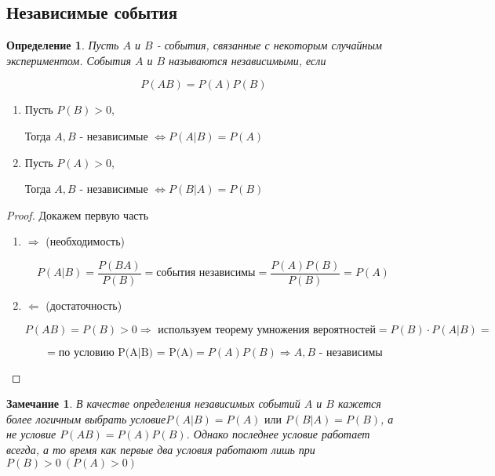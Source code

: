 \documentclass[a4paper, 14pt]{report}
\newtheorem{defenition}{Определение}[section]
\newtheorem{note}{Замечание}[section]
\begin{document}
\subsection{Независимые события}

\begin{defenition}
    Пусть $A$ и $B$ - события, связанные с некоторым случайным экспериментом. События $A$ и $B$ называются независимыми, если

    $$
    P(AB) = P(A)P(B)
    $$
\end{defenition}

\begin{theorem}
    \hfill

    \begin{enumerate}
        \item Пусть $P(B) > 0$,

            Тогда $A,B$ - независимые $\Leftrightarrow P(A|B) = P(A)$

        \item Пусть $P(A) > 0$,

            Тогда $A,B$ - независимые $\Leftrightarrow P(B|A) = P(B)$
    \end{enumerate}
\end{theorem}

\begin{proof}
    Докажем первую часть

    \begin{enumerate}
        \item $\Rightarrow$ (необходимость)

            $$
            P(A|B) = \frac{P(BA)}{P(B)} = \text{события независимы} = \frac{P(A)P(B)}{P(B)} = P(A)
            $$

        \item $\Leftarrow$ (достаточность)

            $$
            P(AB) = P(B) > 0 \Rightarrow \text{ используем теорему умножения вероятностей} = P(B) \cdot P(A|B) = 
            $$

            $$
            = \text{по условию P(A|B) = P(A)} = P(A)P(B) \Rightarrow A,B \text{ - независимы}
            $$
    \end{enumerate}
\end{proof}

\begin{note}
    В качестве определения независимых событий $A$ и $B$ кажется более логичным выбрать условие$P(A|B) = P(A) \text{ или } P(B|A) = P(B)$, а не условие  $P(AB) = P(A)P(B)$. Однако последнее условие работает всегда, а то время как первые два условия работают лишь при $P(B) > 0\ (P(A) > 0)$
\end{note}
\end{document}
